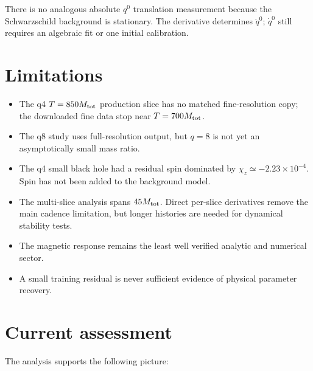 \documentclass[11pt]{article}
\begin{document}
There is no analogous absolute \(q^0\) translation measurement because the
Schwarzschild background is stationary.  The derivative determines
\(\ddot q^0\); \(\dot q^0\) still requires an algebraic fit or one initial
calibration.

\section{Limitations}

\begin{itemize}
  \item The q4 \(T=850M_{\rm tot}\) production slice has no matched
        fine-resolution copy; the downloaded fine data stop near
        \(T=700M_{\rm tot}\).
  \item The q8 study uses full-resolution output, but \(q=8\) is not yet an
        asymptotically small mass ratio.
  \item The q4 small black hole had a residual spin dominated by
        \(\chi_z\simeq-2.23\times10^{-4}\).  Spin has not been added to the
        background model.
  \item The multi-slice analysis spans \(45M_{\rm tot}\).  Direct per-slice
        derivatives remove the main cadence limitation, but longer histories
        are needed for dynamical stability tests.
  \item The magnetic response remains the least well verified analytic and
        numerical sector.
  \item A small training residual is never sufficient evidence of physical
        parameter recovery.
\end{itemize}

\section{Current assessment}

The analysis supports the following picture:
\end{document}
